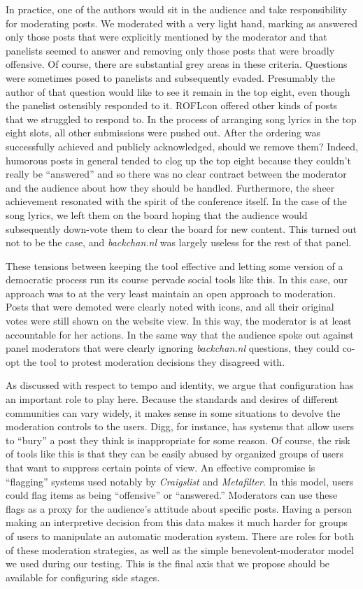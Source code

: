 In practice, one of the authors would sit in the audience and take responsibility for moderating posts. We moderated with a very light hand, marking as answered only those posts that were explicitly mentioned by the moderator and that panelists seemed to answer and removing only those posts that were broadly offensive. Of course, there are substantial grey areas in these criteria. Questions were sometimes posed to panelists and subsequently evaded. Presumably the author of that question would like to see it remain in the top eight, even though the panelist ostensibly responded to it. ROFLcon offered other kinds of posts that we struggled to respond to. In the process of arranging song lyrics in the top eight slots, all other submissions were pushed out. After the ordering was successfully achieved and publicly acknowledged, should we remove them? Indeed, humorous posts in general tended to clog up the top eight because they couldn't really be ``answered'' and so there was no clear contract between the moderator and the audience about how they should be handled. Furthermore, the sheer achievement resonated with the spirit of the conference itself. In the case of the song lyrics, we left them on the board hoping that the audience would subsequently down-vote them to clear the board for new content. This turned out not to be the case, and \emph{backchan.nl} was largely useless for the rest of that panel.

These tensions between keeping the tool effective and letting some version of a democratic process run its course pervade social tools like this. In this case, our approach was to at the very least maintain an open approach to moderation. Posts that were demoted were clearly noted with icons, and all their original votes were still shown on the website view. In this way, the moderator is at least accountable for her actions. In the same way that the audience spoke out against panel moderators that were clearly ignoring \emph{backchan.nl} questions, they could co-opt the tool to protest moderation decisions they disagreed with.

As discussed with respect to tempo and identity, we argue that configuration has an important role to play here. Because the standards and desires of different communities can vary widely, it makes sense in some situations to devolve the moderation controls to the users. Digg, for instance, has systems that allow users to ``bury'' a post they think is inappropriate for some reason. Of course, the risk of tools like this is that they can be easily abused by organized groups of users that want to suppress certain points of view. An effective compromise is ``flagging'' systems used notably by \emph{Craigslist} and \emph{Metafilter}. In this model, users could flag items as being ``offensive'' or ``answered.'' Moderators can use these flags as a proxy for the audience's attitude about specific posts. Having a person making an interpretive decision from this data makes it much harder for groups of users to manipulate an automatic moderation system. There are roles for both of these moderation strategies, as well as the simple benevolent-moderator model we used during our testing. This is the final axis that we propose should be available for configuring side stages. 


